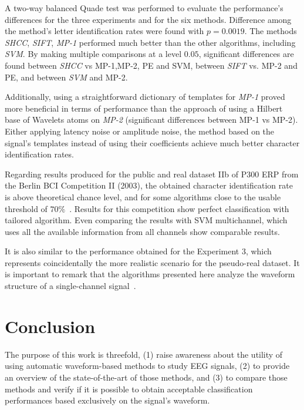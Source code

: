 \documentclass[brainsci,article,submit,moreauthors,pdftex,10pt,a4paper]{mdpi}
\begin{document}
A two-way balanced Quade test was performed to evaluate the performance's differences for the three experiments and for the six methods.  Difference among the method's letter identification rates were found with $p=0.0019$.  The methods \textit{SHCC}, \textit{SIFT}, \textit{MP-1} performed much better than the other algorithms, including \textit{SVM}.  By making multiple comparisons at a level  $0.05$, significant differences are found between \textit{SHCC} vs MP-1,MP-2, PE and SVM, between \textit{SIFT} vs. MP-2 and PE, and between \textit{SVM} and MP-2.

Additionally, using a straightforward dictionary of templates for \textit{MP-1} proved more beneficial in terms of performance than the approach of using a Hilbert base of Wavelets atoms on \textit{MP-2} (significant differences between MP-1 vs MP-2).  Either applying latency noise or amplitude noise, the method based on the signal's templates instead of using their coefficients achieve much better character identification rates.  

Regarding results produced for the public and real dataset IIb of P300 ERP from the Berlin BCI Competition II (2003), the obtained character identification rate is above theoretical chance level, and for some algorithms close to the usable threshold of $70\%$~\citep{Kathner2017}.  Results for this competition show perfect classification with tailored algorithm.  Even comparing the results with SVM multichannel, which uses all the available information from all channels show comparable results.

It is also similar to the performance obtained for the Experiment 3, which represents coincidentally the more realistic scenario for the pseudo-real dataset.  It is important to remark that the algorithms presented here analyze the waveform structure of a single-channel signal~\citep{Rakotomamonjy2008,Gribonval2008}.  

\section{Conclusion}
\label{section:conclusion}

The purpose of this work is threefold, (1) raise awareness about the utility of using automatic waveform-based methods to study EEG signals, (2) to provide an overview of the state-of-the-art of those methods, and (3) to compare those methods and verify if it is possible to obtain acceptable classification performances based exclusively on the signal's waveform.
\end{document}
